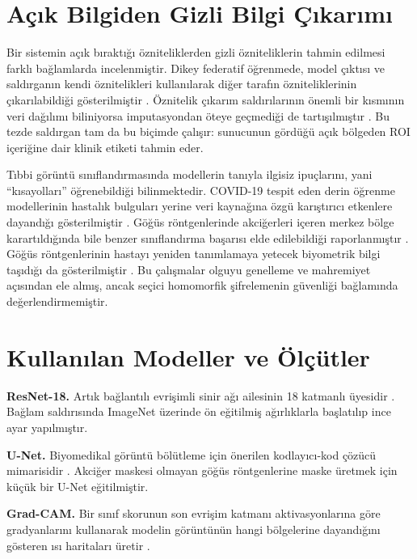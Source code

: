 \section{Açık Bilgiden Gizli Bilgi Çıkarımı}\label{sec:inference}

Bir sistemin açık bıraktığı özniteliklerden gizli özniteliklerin tahmin edilmesi farklı bağlamlarda incelenmiştir. Dikey federatif öğrenmede, model çıktısı ve saldırganın kendi öznitelikleri kullanılarak diğer tarafın özniteliklerinin çıkarılabildiği gösterilmiştir \cite{luo2021feature}. Öznitelik çıkarım saldırılarının önemli bir kısmının veri dağılımı biliniyorsa imputasyondan öteye geçmediği de tartışılmıştır \cite{jayaraman2022imputation}. Bu tezde saldırgan tam da bu biçimde çalışır: sunucunun gördüğü açık bölgeden ROI içeriğine dair klinik etiketi tahmin eder.

Tıbbi görüntü sınıflandırmasında modellerin tanıyla ilgisiz ipuçlarını, yani ``kısayolları'' öğrenebildiği bilinmektedir. COVID-19 tespit eden derin öğrenme modellerinin hastalık bulguları yerine veri kaynağına özgü karıştırıcı etkenlere dayandığı gösterilmiştir \cite{degrave2021shortcuts}. Göğüs röntgenlerinde akciğerleri içeren merkez bölge karartıldığında bile benzer sınıflandırma başarısı elde edilebildiği raporlanmıştır \cite{maguolo2021critic}. Göğüs röntgenlerinin hastayı yeniden tanımlamaya yetecek biyometrik bilgi taşıdığı da gösterilmiştir \cite{packhauser2022reid}. Bu çalışmalar olguyu genelleme ve mahremiyet açısından ele almış, ancak seçici homomorfik şifrelemenin güvenliği bağlamında değerlendirmemiştir.

\section{Kullanılan Modeller ve Ölçütler}\label{sec:models}

\textbf{ResNet-18.} Artık bağlantılı evrişimli sinir ağı ailesinin 18 katmanlı üyesidir \cite{he2016resnet}. Bağlam saldırısında ImageNet üzerinde ön eğitilmiş ağırlıklarla başlatılıp ince ayar yapılmıştır.

\textbf{U-Net.} Biyomedikal görüntü bölütleme için önerilen kodlayıcı-kod çözücü mimarisidir \cite{ronneberger2015unet}. Akciğer maskesi olmayan göğüs röntgenlerine maske üretmek için küçük bir U-Net eğitilmiştir.

\textbf{Grad-CAM.} Bir sınıf skorunun son evrişim katmanı aktivasyonlarına göre gradyanlarını kullanarak modelin görüntünün hangi bölgelerine dayandığını gösteren ısı haritaları üretir \cite{selvaraju2017gradcam}.

